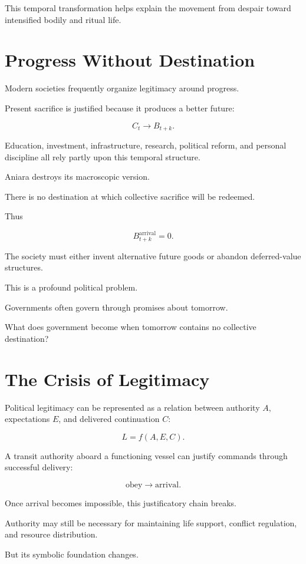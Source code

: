 \documentclass[11pt,oneside]{book}
\theoremstyle{definition}
\theoremstyle{remark}
\begin{document}
This temporal transformation helps explain the movement from despair toward intensified bodily and ritual life.

\section{Progress Without Destination}

Modern societies frequently organize legitimacy around progress.

Present sacrifice is justified because it produces a better future:

\[
C_t
\rightarrow
B_{t+k}.
\]

Education, investment, infrastructure, research, political reform, and personal discipline all rely partly upon this temporal structure.

Aniara destroys its macroscopic version.

There is no destination at which collective sacrifice will be redeemed.

Thus

\[
B_{t+k}^{\mathrm{arrival}}
=
0.
\]

The society must either invent alternative future goods or abandon deferred-value structures.

This is a profound political problem.

Governments often govern through promises about tomorrow.

What does government become when tomorrow contains no collective destination?

\section{The Crisis of Legitimacy}

Political legitimacy can be represented as a relation between authority \(A\), expectations \(E\), and delivered continuation \(C\):

\[
L
=
f(A,E,C).
\]

A transit authority aboard a functioning vessel can justify commands through successful delivery:

\[
\text{obey}
\rightarrow
\text{arrival}.
\]

Once arrival becomes impossible, this justificatory chain breaks.

Authority may still be necessary for maintaining life support, conflict regulation, and resource distribution.

But its symbolic foundation changes.
\end{document}
